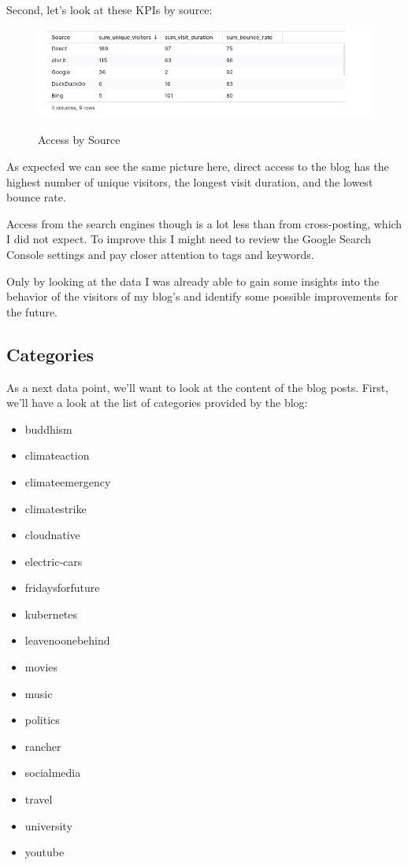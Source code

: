 Second, let's look at these KPIs by source:

\begin{figure}[H]
\centering
\caption {Access by Source}
\includegraphics[width=\linewidth]{images/access-source.png}
\label{fig:accessSource}
\end{figure}

As expected we can see the same picture here, direct access to the blog has the highest number of unique visitors, the longest visit duration, and the lowest bounce rate.

Access from the search engines though is a lot less than from cross-posting, which I did not expect. To improve this I might need to review the Google Search Console settings and pay closer attention to tags and keywords.

Only by looking at the data I was already able to gain some insights into the behavior of the visitors of my blog's and identify some possible improvements for the future.

\subsection{Categories}

As a next data point, we'll want to look at the content of the blog posts. First, we'll have a look at the list of categories provided by the blog:

\begin{itemize}
\item buddhism
\item climateaction
\item climateemergency
\item climatestrike
\item cloudnative
\item electric-cars
\item fridaysforfuture
\item kubernetes
\item leavenoonebehind
\item movies
\item music
\item politics
\item rancher
\item socialmedia
\item travel
\item university
\item youtube
\end{itemize}

